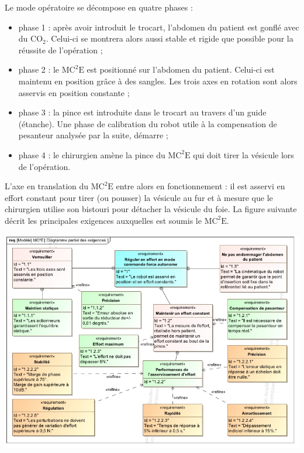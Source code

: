 \documentclass[10pt,fleqn]{article} %
\begin{document}
Le mode opératoire se décompose en quatre phases :
\begin{itemize}
\item phase 1 : après avoir introduit le trocart, l’abdomen du patient est gonflé avec du $\text{CO}_2$. Celui-ci se montrera alors aussi stable et rigide que possible pour la réussite de l’opération ;
\item phase 2 : le $\text{MC}^2\text{E}$ est positionné sur l’abdomen du patient. Celui-ci est maintenu en position grâce à des sangles. Les trois axes en rotation sont alors asservis en position constante ;
\item phase 3 : la pince est introduite dans le trocart au travers d’un guide (étanche). Une phase de calibration du robot utile à la compensation de pesanteur analysée par la suite, démarre ;
\item phase 4 : le chirurgien amène la pince du $\text{MC}^2\text{E}$ qui doit tirer la vésicule lors de l’opération. 
\end{itemize}
L’axe en translation du $\text{MC}^2\text{E}$ entre alors en fonctionnement : il est asservi en effort constant pour tirer (ou pousser) la vésicule au fur et à mesure que le chirurgien utilise son bistouri pour détacher la vésicule du foie. La figure suivante décrit les principales exigences auxquelles est soumis le $\text{MC}^2\text{E}$.

\begin{center}
\includegraphics[width=\linewidth]{images/fig_05}
\end{center}
\end{document}
